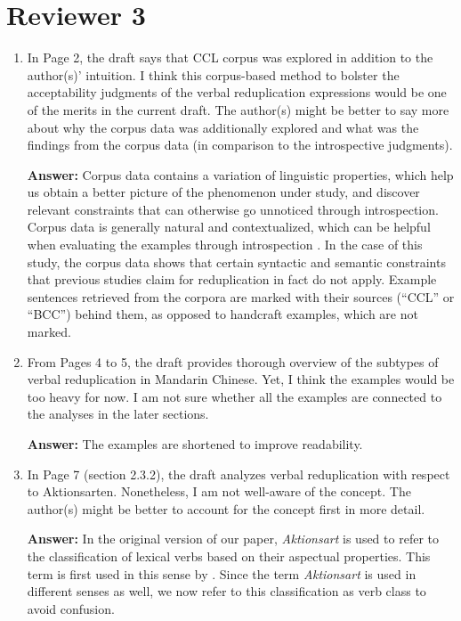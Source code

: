 \documentclass[fleqn,twoside]{article}
\begin{document}
\section{Reviewer 3}

\begin{enumerate}
\item
In Page 2, the draft says that CCL corpus was explored in addition to the author(s)’ intuition. I think this corpus-based method to bolster the acceptability judgments of the verbal reduplication expressions would be one of the merits in the current draft. The author(s) might be better to say more about why the corpus data was additionally explored and what was the findings from the corpus data (in comparison to the introspective judgments).

\textbf{Answer:}
 Corpus data contains a variation of linguistic properties, which help us obtain a better picture of the phenomenon under study,
 and discover relevant constraints that can otherwise go unnoticed through introspection.
 Corpus data is generally natural and contextualized, which can be helpful when evaluating the examples through introspection \citep[921]{MM2009a}.
 In the case of this study, the corpus data shows that certain syntactic and semantic constraints that previous studies claim for reduplication in fact do not apply.
Example sentences retrieved from the corpora are marked with their sources (``CCL'' or ``BCC'') behind them,
as opposed to handcraft examples, which are not marked.

\item
From Pages 4 to 5, the draft provides thorough overview of the subtypes of verbal reduplication in Mandarin Chinese. Yet, I think the examples would be too heavy for now. I am not sure whether all the examples are connected to the analyses in the later sections.

\textbf{Answer:} The examples are shortened to improve readability.

\item 
In Page 7 (section 2.3.2), the draft analyzes verbal reduplication with respect to Aktionsarten. Nonetheless, I am not well-aware of the concept. The author(s) might be better to account for the concept first in more detail.

\textbf{Answer:} 
In the original version of our paper, \textit{Aktionsart} is used to refer to the classification of lexical verbs based on their aspectual properties.
This term is first used in this sense by \citet{Agrell1908}. %
Since the term \textit{Aktionsart} is used in different senses as well,
we now refer to this classification as verb class to avoid confusion.


\end{enumerate}
\end{document}
